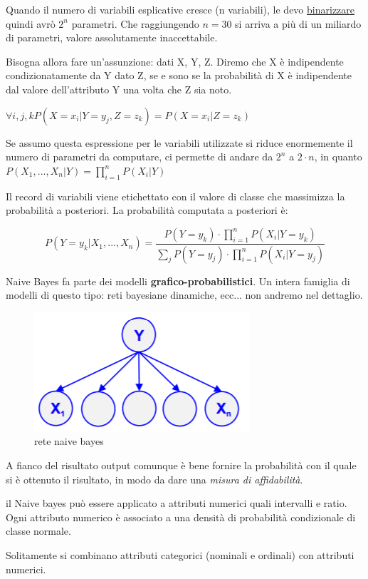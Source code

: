 Quando il numero di variabili esplicative cresce (n variabili), le devo \underline{binarizzare} quindi avr\`o $2^n$ parametri. Che raggiungendo $n=30$ si arriva a pi\`u di un miliardo di parametri, valore assolutamente inaccettabile.

Bisogna allora fare un'assunzione: dati X, Y, Z. Diremo che X \`e indipendente condizionatamente da Y dato Z, se e sono se la probabilit\`a di X è indipendente dal valore dell'attributo Y una volta che Z sia noto. 

$\forall i,j,k P(X=x_i|Y=y_j, Z=z_k) = P(X=x_i|Z=z_k)$

Se assumo questa espressione per le variabili utilizzate si riduce enormemente il numero di parametri da computare, ci permette di andare da $2^n$ a $2 \cdot n$, in quanto $P(X_1, ..., X_n|Y) = \prod_{i=1}^n P(X_i|Y)$

Il record di variabili viene etichettato con il valore di classe che massimizza la probabilit\`a a posteriori.
La probabilit\`a computata a posteriori \`e:

\[P(Y=y_k|X_1,...,X_n) = \frac{P(Y=y_k)\cdot \prod_{i=1}^{n}P(X_i|Y=y_k)}{\sum_{j}P(Y=y_j) \cdot \prod_{i=1}^{n}P(X_i|Y=y_j)} \]

Naive Bayes fa parte dei modelli \textbf{grafico-probabilistici}. Un intera famiglia di modelli di questo tipo: reti bayesiane dinamiche, ecc... non andremo nel dettaglio.

\begin{figure}[h!]
	\centering
	\includegraphics[height=0.3 \linewidth]{classification/pict/naivebayes.png}
	\caption{rete naive bayes}
\end{figure}

A fianco del risultato output comunque \`e bene fornire la probabilit\`a con il quale si \`e ottenuto il risultato, in modo da dare una \textit{misura di affidabilit\`a}. 

il Naive bayes pu\`o essere applicato a attributi numerici quali intervalli e ratio. Ogni attributo numerico è associato a una densit\`a di probabilit\`a condizionale di classe normale. 

Solitamente si combinano attributi categorici (nominali e ordinali) con attributi numerici. 

